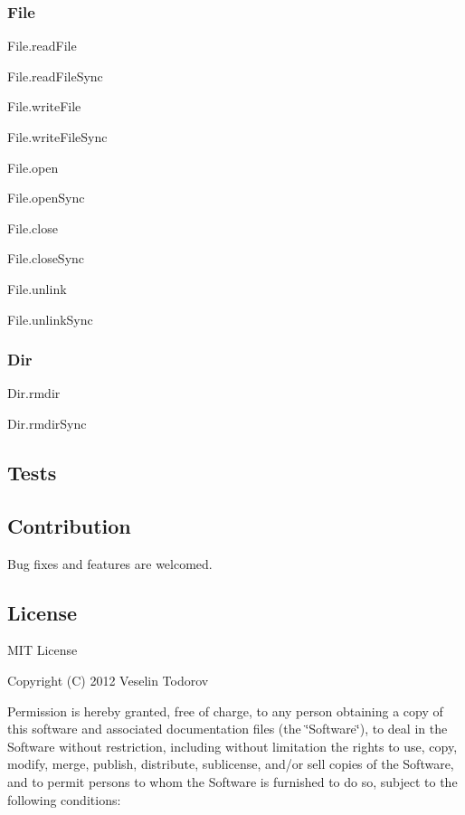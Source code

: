 \subsubsection*{File}


\begin{DoxyItemize}
\item File.\+read\+File
\item File.\+read\+File\+Sync
\item File.\+write\+File
\item File.\+write\+File\+Sync
\item File.\+open
\item File.\+open\+Sync
\item File.\+close
\item File.\+close\+Sync
\item File.\+unlink
\item File.\+unlink\+Sync
\end{DoxyItemize}

\subsubsection*{Dir}


\begin{DoxyItemize}
\item Dir.\+rmdir
\item Dir.\+rmdir\+Sync
\end{DoxyItemize}

\subsection*{Tests}



\subsection*{Contribution}

Bug fixes and features are welcomed.

\subsection*{License}

M\+I\+T License

Copyright (C) 2012 Veselin Todorov

Permission is hereby granted, free of charge, to any person obtaining a copy of this software and associated documentation files (the \char`\"{}\+Software\char`\"{}), to deal in the Software without restriction, including without limitation the rights to use, copy, modify, merge, publish, distribute, sublicense, and/or sell copies of the Software, and to permit persons to whom the Software is furnished to do so, subject to the following conditions\+:

